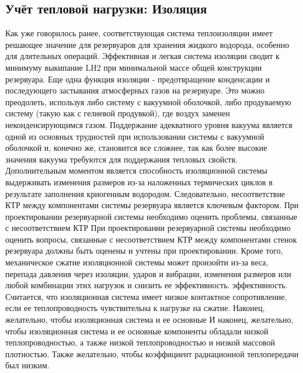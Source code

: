 \subsection{Учёт тепловой нагрузки: Изоляция}\label{ch:overview:1:sec4:sub1}

Как уже говорилось ранее, соответствующая система теплоизоляции имеет решающее значение для резервуаров для хранения жидкого водорода, особенно для длительных операций. Эффективная и легкая система изоляции сводит к минимуму выкипание LH2 при минимальной массе общей конструкции резервуара. Еще одна функция изоляции - предотвращение конденсации и последующего застывания атмосферных газов на резервуаре. 
Это можно преодолеть, используя либо систему с вакуумной оболочкой, либо продуваемую систему (такую как 
с гелиевой продувкой), где воздух заменен неконденсирующимся газом. Поддержание адекватного уровня вакуума 
является одной из основных трудностей при использовании системы с вакуумной оболочкой и, конечно же, становится все сложнее, так как более высокие значения вакуума требуются для поддержания тепловых свойств. Дополнительным моментом является способность изоляционной системы выдерживать изменения размеров из-за наложенных термических циклов в результате 
заполнения криогенным водородом. Следовательно, несоответствие КТР между компонентами системы резервуара является ключевым фактором. При проектировании резервуарной системы необходимо оценить проблемы, связанные с несоответствием КТР 
 При проектировании резервуарной системы необходимо оценить вопросы, связанные с несоответствием КТР между компонентами стенок резервуара должны быть оценены и учтены при проектировании. Кроме того, механическое сжатие изоляционной системы может произойти из-за веса, перепада давления через изоляции, ударов и вибрации, изменения размеров или любой комбинации этих нагрузок и снизить ее эффективность.  эффективность. Считается, что изоляционная система имеет низкое контактное сопротивление, если ее теплопроводность 
чувствительна к нагрузке на сжатие. Наконец, желательно, чтобы изоляционная система и ее основные И наконец, желательно, чтобы изоляционная система и ее основные компоненты обладали низкой теплопроводностью, а также низкой теплопроводностью и низкой массовой плотностью. Также желательно, чтобы коэффициент радиационной теплопередачи был низким. 

